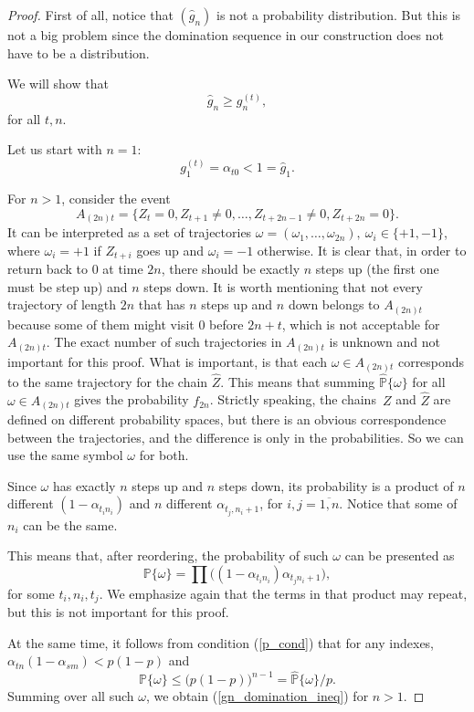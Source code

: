 \documentclass[numbers,compress,v1.0.1]{vmsta}
\theoremstyle{definition}
\begin{document}
%
\begin{proof}

First of all, notice that $(\hat g_n)$ is not a probability
distribution. But this is not a big problem since the domination
sequence in our construction does not have to be
a distribution.

We will show that
%
\begin{equation}
\label{gn_domination_ineq} \hat g_n \ge g^{(t)}_n,
\end{equation}
%
for all $t,n$.

Let us start with $n=1$:
%
\[
g^{(t)}_1 = \alpha_{t0} < 1 = \hat
g_1.
\]

For $n > 1$, consider the event
%
\[
A_{(2n)t} = \{Z_t = 0, Z_{t+1} \neq0, \ldots,
Z_{t+2n-1} \neq0, Z_{t+2n} = 0\}.
\]
%
It can be interpreted as a set of trajectories
$\omega=(\omega_1, \ldots,\omega_{2n}), ~{\omega_i \in\{+1, -1\}} $,
where $\omega_i = +1$ if $Z_{t+i}$ goes up and $\omega_i=-1$ otherwise.
It is clear that, in order to return back to $0$ at time $2n$, there
should be exactly $n$ steps up (the first one must be step up) and $n$
steps down.
It is worth mentioning that not every trajectory of length $2n$ that
has $n$ steps up and $n$ down belongs to $A_{(2n)t}$ because some of
them might visit $0$ before $2n+t$,
which is not acceptable for $A_{(2n)t}$. The exact number of such
trajectories in $A_{(2n)t}$ is unknown and not important for this proof.
What is important, is that each $\omega\in A_{(2n)t}$ corresponds to
the same trajectory for the chain $\hat Z$. This means that summing
$\mathbb{\hat P}\{\omega\}$
for all $\omega\in A_{(2n)t}$ gives the probability $f_{2n}$. Strictly
speaking, the chains~$Z$ and $\hat Z$ are defined on different
probability spaces, but there is an
obvious correspondence between the trajectories, and the difference is
only in the probabilities. So we can use the same symbol $\omega$ for both.

Since $\omega$ has exactly $n$ steps up and $n$ steps down, its
probability is a product of $n$ different $(1-\alpha_{t_i n_i})$ and
$n$ different $\alpha_{t_j, n_i+1}$, for
$i, j = \overline{1,n}$. Notice that some of $n_i$ can be the same.

This means that, after reordering, the probability of such $\omega$ can
be presented as
%
\begin{equation}
\mathbb{P}\{\omega\} = \prod \bigl((1-\alpha_{t_i n_i})
\alpha_{t_j
n_i+1} \bigr),
\end{equation}
%
for some $t_i, n_i, t_j$. We emphasize again that the terms in that
product may repeat, but this is not important for this proof.

At the same time, it follows from condition (\ref{p_cond}) that for any
indexes, $\alpha_{t n}(1-\alpha_{s m}) < p(1-p)$ and
%
\begin{equation}
\mathbb{P}\{\omega\} \le\bigl(p(1-p)\bigr)^{n-1} = \mathbb{\hat P}\{
\omega\}/p.
\end{equation}
%
Summing over all such $\omega$, we obtain (\ref{gn_domination_ineq})
for $n > 1$.
\end{proof}
\end{document}
